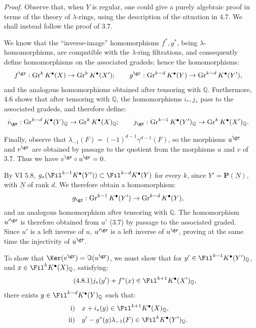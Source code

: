 \emph{Proof.} Observe that, when \(Y\) is regular, one could give a purely algebraic proof in terms of the theory of \(\lambda\)-rings, using the description of the situation in 4.7. We shall instead follow the proof of 3.7.

We know that the ``inverse-image'' homomorphisms \(f^*,g^*\), being \(\lambda\)-homomorphisms, are compatible with the \(\lambda\)-ring filtrations, and consequently define homomorphisms on the associated gradeds; hence the homomorphisms:
\[
  f^{\gr}:\operatorname{Gr}^kK^{\bullet}(X)\to\operatorname{Gr}^kK^{\bullet}(X');
  \qquad
  g^{\gr}:\operatorname{Gr}^{k-d}K^{\bullet}(Y)\to\operatorname{Gr}^{k-d}K^{\bullet}(Y'),
\]
and the analogous homomorphisms obtained after tensoring with \(\mathbb Q\). Furthermore, 4.6 shows that after tensoring with \(\mathbb Q\), the homomorphisms \(i_*,j_*\) pass to the associated gradeds, and therefore define:
\[
  i_{\gr}:\operatorname{Gr}^{k-d}K^{\bullet}(Y)_{\mathbb Q}
  \to \operatorname{Gr}^{k}K^{\bullet}(X)_{\mathbb Q};
  \qquad
  j_{\gr}:\operatorname{Gr}^{k-1}K^{\bullet}(Y')_{\mathbb Q}
  \to \operatorname{Gr}^{k}K^{\bullet}(X')_{\mathbb Q}.
\]

%
Finally, observe that \(\lambda_{-1}(F)=(-1)^{d-1}\gamma^{d-1}(F)\), so the morphisms \(u^{\gr}\) and \(v^{\gr}\) are obtained by passage to the quotient from the morphisms \(u\) and \(v\) of 3.7. Thus we have \(v^{\gr}\circ u^{\gr}=0\).

By VI 5.8, \(g_*(\Fil^{k-1}K^{\bullet}(Y'))\subset \Fil^{k-d}K^{\bullet}(Y)\) for every \(k\), since \(Y'=\mathbf P(\underline{N})\), with \(\underline{N}\) of rank \(d\). We therefore obtain a homomorphism:
\[
  g_{\gr}:\operatorname{Gr}^{k-1}K^{\bullet}(Y')
  \to\operatorname{Gr}^{k-d}K^{\bullet}(Y),
\]
and an analogous homomorphism after tensoring with \(\mathbb Q\). The homomorphism \(u'^{\gr}\) is therefore obtained from \(u'\) (3.7) by passage to the associated graded. Since \(u'\) is a left inverse of \(u\), \(u'^{\gr}\) is a left inverse of \(u^{\gr}\), proving at the same time the injectivity of \(u^{\gr}\).

To show that \(\Ker(v^{\gr})=\Im(u^{\gr})\), we must show that for \(y'\in\Fil^{k-1}K^{\bullet}(Y')_{\mathbb Q}\), and \(x\in\Fil^kK^{\bullet}(X)_{\mathbb Q}\), satisfying:
\begin{equation}\tag{4.8.1}
  j_*(y')+f^*(x)\in\Fil^{k+1}K^{\bullet}(X')_{\mathbb Q},
\end{equation}
there exists \(y\in\Fil^{k-d}K^{\bullet}(Y)_{\mathbb Q}\) such that:
\[
\begin{aligned}
\text{i)}\quad &x+i_*(y)\in\Fil^{k+1}K^{\bullet}(X)_{\mathbb Q},\\
\text{ii)}\quad &y'-g^*(y)\lambda_{-1}(F)\in\Fil^{k}K^{\bullet}(Y')_{\mathbb Q}.
\end{aligned}
\]

